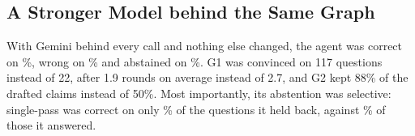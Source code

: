 \subsection{A Stronger Model behind the Same Graph}

With Gemini behind every call and nothing else changed, the agent was correct on
\nGemCorrect\%, wrong on \nGemWrong\% and abstained on \nGemAbstain\%. G1 was convinced on
117 questions instead of 22, after 1.9 rounds on average instead of 2.7, and G2 kept
88\% of the drafted claims instead of 50\%. Most importantly, its abstention was
selective: single-pass was correct on only \nSelGemHeld\% of the questions it held back,
against \nSelGemAns\% of those it answered.
